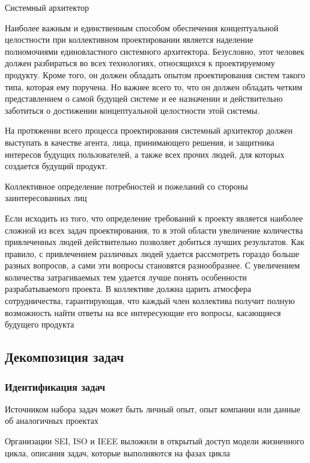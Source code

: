 \documentclass{../industrial-development}
\begin{document}
Системный архитектор

Наиболее важным и единственным способом обеспечения концептуальной целостности при коллективном проектировании является наделение полномочиями единовластного системного архитектора. Безусловно, этот человек должен разбираться во всех технологиях, относящихся к проектируемому продукту. Кроме того, он должен обладать опытом проектирования систем такого типа, которая ему поручена. Но важнее всего то, что он должен обладать четким представлением о самой будущей системе и ее назначении и действительно заботиться о достижении концептуальной целостности этой системы.

На протяжении всего процесса проектирования системный архитектор должен выступать в качестве агента, лица, принимающего решения, и защитника интересов будущих пользователей, а также всех прочих людей, для которых создается будущий продукт.

Коллективное определение потребностей и пожеланий со стороны заинтересованных лиц

Если исходить из того, что определение требований к проекту является наиболее сложной из всех задач проектирования, то в этой области увеличение количества привлеченных людей действительно позволяет добиться лучших результатов. Как правило, с привлечением различных людей удается рассмотреть гораздо больше разных вопросов, а сами эти вопросы становятся разнообразнее. С увеличением количества затрагиваемых тем удается лучше понять особенности разрабатываемого проекта. В коллективе должна царить атмосфера сотрудничества, гарантирующая, что каждый член коллектива получит полную возможность найти ответы на все интересующие его вопросы, касающиеся будущего продукта~\cite[с.~94--110]{Brooks2012}

\subsection{Декомпозиция задач}

\begin{frame} \frametitle{Идентификация задач}
	\begin{block}{}
		Источником набора задач может быть личный опыт, опыт компании или данные об аналогичных проектах
	\end{block}
	\begin{block}{}
		Организации SEI, ISO и IEEE выложили в открытый доступ модели жизненного цикла, описания задач, которые выполняются на фазах цикла
	\end{block}
\end{frame}
\end{document}

